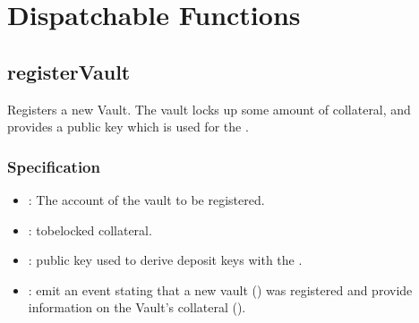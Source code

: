 \documentclass[a4paper,10pt,english]{sphinxmanual}
\begin{document}
\section{Dispatchable Functions}
\label{\detokenize{spec/vault-registry:dispatchable-functions}}

\subsection{registerVault}
\label{\detokenize{spec/vault-registry:registervault}}\label{\detokenize{spec/vault-registry:id4}}
Registers a new Vault. The vault locks up some amount of collateral, and provides a public key which is used for the {\hyperref[\detokenize{security_performance/security-analysis:okd}]{}}.


\subsubsection{Specification}
\label{\detokenize{spec/vault-registry:specification}}


\begin{itemize}
\item {} 
: The account of the vault to be registered.

\item {} 
: to\sphinxhyphen{}be\sphinxhyphen{}locked collateral.

\item {} 
: public key used to derive deposit keys with the {\hyperref[\detokenize{security_performance/security-analysis:okd}]{}}.

\end{itemize}

\begin{itemize}
\item {} 
: emit an event stating that a new vault () was registered and provide information on the Vault’s collateral ().

\end{itemize}
\end{document}
